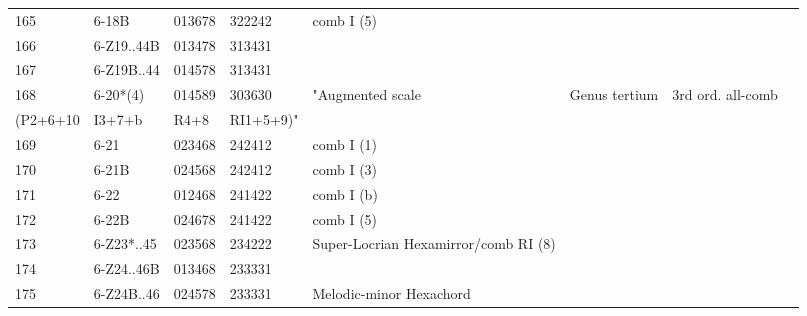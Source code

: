 \begin{table}[h]
\begin{tabular}{lllll}
165                    & 6-18B               & 013678  & 322242    & comb I (5)                                                 &                             &                   &      &     \\
166                    & 6-Z19..44B          & 013478  & 313431    &                                                            &                             &                   &      &     \\
167                    & 6-Z19B..44          & 014578  & 313431    &                                                            &                             &                   &      &     \\
168                    & 6-20*(4)            & 014589  & 303630    & "Augmented scale                                           & Genus tertium               & 3rd ord. all-comb &      &     \\
(P2+6+10               & I3+7+b              & R4+8    & RI1+5+9)" &                                                            &                             &                   &      &     \\
169                    & 6-21                & 023468  & 242412    & comb I (1)                                                 &                             &                   &      &     \\
170                    & 6-21B               & 024568  & 242412    & comb I (3)                                                 &                             &                   &      &     \\
171                    & 6-22                & 012468  & 241422    & comb I (b)                                                 &                             &                   &      &     \\
172                    & 6-22B               & 024678  & 241422    & comb I (5)                                                 &                             &                   &      &     \\
173                    & 6-Z23*..45          & 023568  & 234222    & Super-Locrian Hexamirror/comb RI (8)                       &                             &                   &      &     \\
174                    & 6-Z24..46B          & 013468  & 233331    &                                                            &                             &                   &      &     \\
175                    & 6-Z24B..46          & 024578  & 233331    & Melodic-minor Hexachord                                    &                             &                   &      &     \\

\end{tabular}
\end{table}
